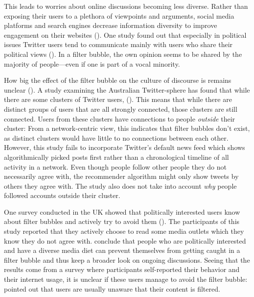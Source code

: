 This leads to worries about online discussions becoming less diverse. Rather than exposing their users to a plethora of viewpoints and arguments, social media platforms and search engines decrease information diversity to improve engagement on their websites (\cite{bozdagBreakingFilterBubble2015}). One study found out that especially in political issues Twitter users tend to communicate mainly with users who share their political views (\cite{barberaTweetingLeftRight2015}). In a filter bubble, the own opinion seems to be shared by the majority of people---even if one is part of a vocal minority.

How big the effect of the filter bubble on the culture of discourse is remains unclear (\cite{brunsEchoChamberWhat2017}). A study examining the Australian Twitter-sphere has found that while there are some clusters of Twitter users,  (\cite[9]{brunsEchoChamberWhat2017}). This means that while there are distinct groups of users that are all strongly connected, those clusters are still connected. Users from these clusters have connections to people \emph{outside} their cluster: From a network-centric view, this indicates that filter bubbles don't exist, as distinct clusters would have little to no connections between each other. However, this study fails to incorporate Twitter's default news feed which shows algorithmically picked posts first rather than a chronological timeline of all activity in a network. Even though people follow other people they do not necessarily agree with, the recommender algorithm might only show tweets by others they agree with. The study also does not take into account \emph{why} people followed accounts outside their cluster. 

One survey conducted in the UK showed that politically interested users know about filter bubbles and actively try to avoid them (\cite{duboisEchoChamberOverstated2018}). The participants of this study reported that they actively choose to read some media outlets which they know they do not agree with. \citeauthor{duboisEchoChamberOverstated2018} conclude that people who are politically interested and have a diverse media diet can prevent themselves from getting caught in a filter bubble and thus keep a broader look on ongoing discussions. Seeing that the results come from a survey where participants self-reported their behavior and their internet usage, it is unclear if these users manage to avoid the filter bubble: \citeauthor{bozdagBreakingFilterBubble2015} pointed out that users are usually unaware that their content is filtered. 

